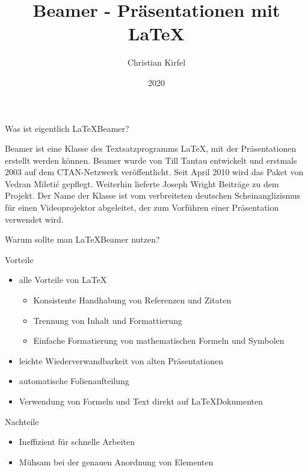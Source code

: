 \documentclass{beamer}
\title{Beamer - Präsentationen mit \LaTeX}
\author{Christian Kirfel}
\institute{Physikalisches Institut Bonn}
\date{2020}
\begin{document}
\frame{\titlepage}


\begin{frame}{Was ist eigentlich \LaTeX Beamer?}
    \begin{center}
        Beamer ist eine Klasse des Textsatzprogramms LaTeX, mit der Präsentationen erstellt werden können.
        Beamer wurde von Till Tantau entwickelt und erstmals 2003 auf dem CTAN-Netzwerk veröffentlicht.
        Seit April 2010 wird das Paket von Vedran Miletić gepflegt. Weiterhin lieferte Joseph Wright Beiträge zu dem Projekt.
        Der Name der Klasse ist vom verbreiteten deutschen Scheinanglizismus für einen Videoprojektor abgeleitet, der zum Vorführen einer Präsentation verwendet wird.
    \end{center}
\end{frame}

\begin{frame}{Warum sollte man \LaTeX Beamer nutzen?}
\begin{block}{Vorteile}
    \begin{itemize}
        \item alle Vorteile von \LaTeX
            \begin{itemize}
                \item Konsistente Handhabung von Referenzen und Zitaten
                \item Trennung von Inhalt und Formattierung 
                \item Einfache Formatierung von mathematischen Formeln und Symbolen
            \end{itemize}
        \item leichte Wiederverwandbarkeit von alten Präsentationen
        \item automatische Folienaufteilung
        \item Verwendung von Formeln und Text direkt auf \LaTeX Dokumenten
    \end{itemize}
\end{block}
\begin{block}{Nachteile}
    \begin{itemize}
        \item Ineffizient für schnelle Arbeiten
        \item Mühsam bei der genauen Anordnung von Elementen
    \end{itemize}
\end{block}
\end{frame}

\end{document}
